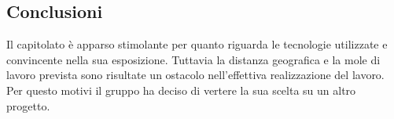     \subsection{Conclusioni}
    Il capitolato è apparso stimolante per quanto riguarda le tecnologie utilizzate e convincente nella sua esposizione. Tuttavia la distanza geografica e la
    mole di lavoro prevista sono risultate un ostacolo nell'effettiva realizzazione del lavoro. Per questo motivi il gruppo ha deciso di vertere la sua scelta
    su un altro progetto.
